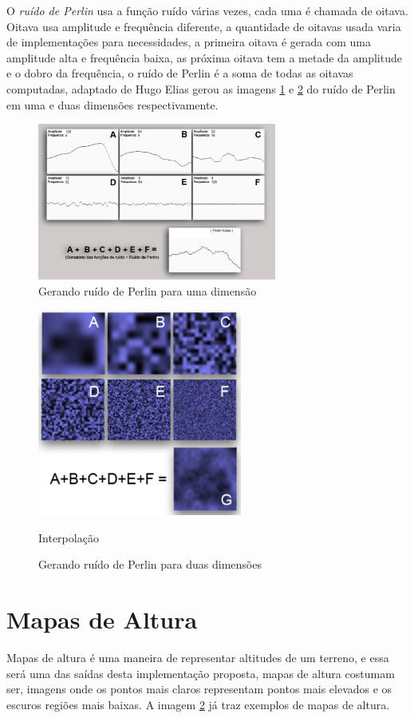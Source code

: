 O \textit{ruído de Perlin} usa a função ruído várias vezes, cada uma é chamada
de oitava. Oitava usa amplitude e frequência diferente, a quantidade de oitavas
usada varia de implementações para necessidades, a primeira oitava é gerada com uma
amplitude alta e frequência baixa, as próxima oitava tem a metade da amplitude e 
o dobro da frequência, o ruído de Perlin é a soma de todas as oitavas computadas,
adaptado de Hugo Elias \cite{carli2012canion} gerou as imagens
\ref{fig:perlin1d} e \ref{fig:perlin2d} do ruído de Perlin em uma e duas
dimensões respectivamente.
\begin{figure}[H]
    \centering
    \includegraphics[width=0.7\textwidth]{figuras/perlin1d.png}
    \caption{Gerando ruído de Perlin para uma dimensão}
    \label{fig:perlin1d}
\end{figure}
\begin{figure}[H]
    \centering
    \includegraphics[width=0.6\textwidth]{figuras/perlin2d.png}
    \caption{Gerando ruído de Perlin para duas dimensões}Interpolação
    \label{fig:perlin2d}
\end{figure}

\section{Mapas de Altura}
Mapas de altura é uma maneira de representar altitudes de um terreno, e essa
será uma das saídas desta implementação proposta, mapas de altura costumam ser, imagens
onde os pontos mais claros representam pontos mais elevados e os escuros regiões mais baixas.
A imagem \ref{fig:perlin2d} já traz exemplos de mapas de altura.

